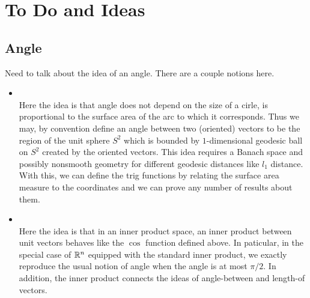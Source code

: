 \documentclass{book}
\begin{document}
	
	\part{To Do and Ideas}
	
	\chapter{Angle}
	
	Need to talk about the idea of an angle. There are a couple notions here. 
	\begin{itemize}
		\item {} \\
		Here the idea is that angle does not depend on the size of a cirle, is proportional to the surface area of the arc to which it corresponds. Thus we may, by convention define an angle between two (oriented) vectors to be the region of the unit sphere $S^2$ which is bounded by $1$-dimensional geodesic ball on $S^2$ created by the oriented vectors. This idea requires a Banach space and possibly nonsmooth geometry for different geodesic distances like $l_1$ distance. With this, we can define the trig functions by relating the surface area measure to the coordinates and we can prove any number of results about them.
		\item  {} \\
		Here the idea is that in an inner product space, an inner product between unit vectors behaves like the $\cos$ function defined above. In paticular, in the special case of $\mathbb{R}^n$ equipped with the standard inner product, we exactly reproduce the usual notion of angle when the angle is at most $\pi/2$. In addition, the inner product connects the ideas of angle-between and length-of vectors. 
	\end{itemize}
	
	
	
	
	
\end{document}
